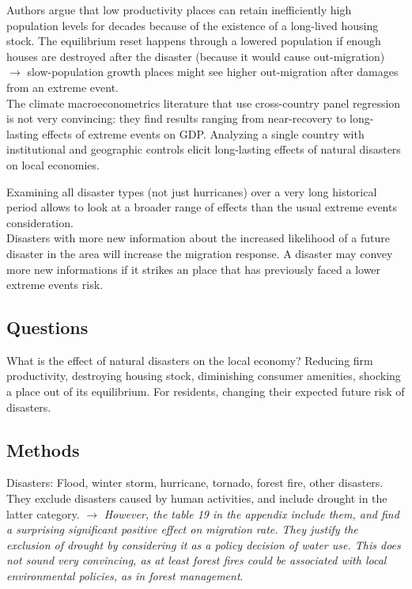 \documentclass[11pt, oneside]{article}   	%
\begin{document}
Authors argue that low productivity places can retain inefficiently high population levels for decades because of the existence of a long-lived housing stock. The equilibrium reset happens through a lowered population if enough houses are destroyed after the disaster (because it would cause out-migration) $\to$ slow-population growth places might see higher out-migration after damages from an extreme event. \\

The climate macroeconometrics literature that use cross-country panel regression is not very convincing: they find results ranging from near-recovery to long-lasting effects of extreme events on GDP. Analyzing a single country with institutional and geographic controls elicit long-lasting effects of natural disasters on local economies.

Examining all disaster types (not just hurricanes) over a very long historical period allows to look at a broader range of effects than the usual extreme events consideration. \\

Disasters with more new information about the increased likelihood of a future disaster in the area will increase the migration response. A disaster may convey more new informations if it strikes an place that has previously faced a lower extreme events risk. \\

\subsection{Questions}
What is the effect of natural disasters on the local economy? Reducing firm productivity, destroying housing stock, diminishing consumer amenities, shocking a place out of its equilibrium. For residents, changing their expected future risk of disasters.

\subsection{Methods}
Disasters: Flood, winter storm, hurricane, tornado, forest fire, other disasters. They exclude disasters caused by human activities, and include drought in the latter category. $\to$ \textit{However, the table 19 in the appendix include them, and find a surprising significant positive effect on migration rate. They justify the exclusion of drought by considering it as a policy decision of water use. This does not sound very convincing, as at least forest fires could be associated with local environmental policies, as in forest management}. \\
\end{document}
